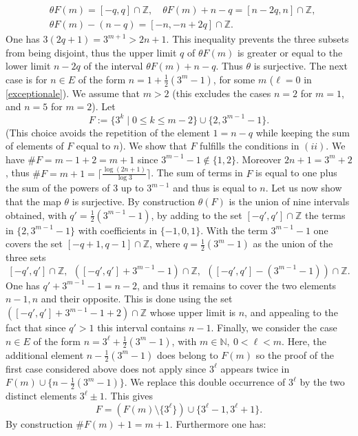 \documentclass[cupthm]{CUP-JNL-JMJ}
\numberwithin{equation}{section}
\theoremstyle{cupplain}
\theoremstyle{cupdefinition}
\theoremstyle{cupremark}
\theoremstyle{cupproof}
\def\N{{\mathbb N}}
\def\Z{{\mathbb Z}}
\begin{document}
\begin{align*}
&\theta F(m)=[-q,q]\cap \Z, \quad \theta F(m)+n-q=[n-2q,n]\cap \Z,\\ &\theta F(m)-(n-q)=[-n,-n+2q]\cap \Z.
\end{align*}
One has $3(2q+1)=3^{m+1}>2n+1$. This inequality  prevents the three subsets from being disjoint, thus the upper limit $q$ of $\theta F(m)$ is greater or equal to the lower limit $n-2q$ of the interval $\theta F(m)+n-q$. Thus $\theta$ is surjective. \newline
The next case is for $n\in E$ of the form $n=1+\frac{1}{2} \left(3^m-1\right)$, for some $m$ ($\ell=0$ in \eqref{exceptionale}). We assume that $m>2$ (this excludes the cases $n=2$ for $m=1$, and $n=5$ for $m=2$). Let 
\[
F:=\{3^k\mid 0\leq k\leq m-2\}\cup \{2,3^{m-1}-1\}.
\]
(This choice avoids the repetition of the element $1=n-q$ while keeping the sum of elements of $F$ equal to $n$).
We show that $F$ fulfills the conditions in $(ii)$. We have $\# F=m-1+2=m+1$ since $3^{m-1}-1 \notin \{1,2\}$. Moreover $2n+1=3^m+2$,  thus $\#F=m+1=\lceil \frac{\log(2n+1)}{\log 3}\rceil$. The sum of terms in $F$ is equal to one plus the sum of the powers of $3$ up to $3^{m-1}$ and thus is equal to  $n$. Let us now show that the map $\theta$ is surjective. By construction $\theta(F)$ is the union of  nine intervals obtained, with $q'=\frac{1}{2} (3^{m-1}-1)$, by adding to the set $[-q',q']\cap \Z$ the terms in $\{2,3^{m-1}-1\}$ with coefficients in $\{-1,0,1\}$. With the term $3^{m-1}-1$ one covers the set $[-q+1,q-1]\cap \Z$, where $q=\frac{1}{2} \left(3^{m}-1\right)$ as the union of the three sets
\[
[-q',q']\cap \Z, \ \ ([-q',q']+3^{m-1}-1)\cap \Z, \ \ ([-q',q']-(3^{m-1}-1))\cap \Z.
\] 
One has $q'+3^{m-1}-1=n-2$, and thus it  remains to cover the two elements $n-1,n$ and their opposite. This is done using the set
$([-q',q']+3^{m-1}-1 +2)\cap \Z$ whose upper limit is $n$, and appealing to the fact that since $q'>1$ this interval contains $n-1$.\newline
Finally, we consider the case  $n\in E$  of the form $n=3^\ell+\frac{1}{2} \left(3^m-1\right)$, with $m\in \N, ~0< \ell<m $. Here, the additional element $n-\frac{1}{2} \left(3^m-1\right)$ does  belong to $F(m)$ so the proof of the first case considered above does not apply since $3^\ell$ appears twice in $F(m)\cup \{n-\frac{1}{2} \left(3^m-1\right)\}$. We replace this double occurrence of $3^\ell$ by the two distinct elements $3^\ell\pm 1$. This gives
\[
F=(F(m)\setminus \{3^\ell\})\cup \{3^\ell-1,3^\ell+1\}.
\]
By construction  $\# F(m) +1=m+1$. Furthermore one has:  
\end{document}
